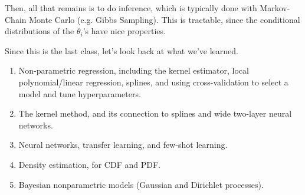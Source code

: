 Then, all that remains is to do inference, which is typically done with Markov-Chain Monte Carlo (e.g. Gibbs Sampling). This is tractable, since the conditional distributions of the $\theta_i$'s have nice properties.

Since this is the last class, let's look back at what we've learned.
\begin{enumerate}
\item Non-parametric regression, including the kernel estimator, local polynomial/linear regression, splines, and using cross-validation to select a model and tune hyperparameters.
\item The kernel method, and its connection to splines and wide two-layer neural networks.
\item Neural networks, transfer learning, and few-shot learning.
\item Density estimation, for CDF and PDF.
\item Bayesian nonparametric models (Gaussian and Dirichlet processes).
\end{enumerate}